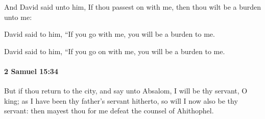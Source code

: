 			\begin{versebox}
					\item[BHS] 
					\item[ASV] And David said unto him, If thou passest on with me, then thou wilt be a burden unto me:
					\item[NIV] David said to him, “If you go with me, you will be a burden to me.
					\item[NRSV] David said to him, “If you go on with me, you will be a burden to me.
			\end{versebox}

		\paragraph{2 Samuel 15:34} %
			\label{2SAMUEL-15-34}

			But if thou return to the city, and say unto Absalom, I will be thy servant, O king; as I have been thy father’s servant hitherto, so will I now also be thy servant: then mayest thou for me defeat the counsel of Ahithophel.

